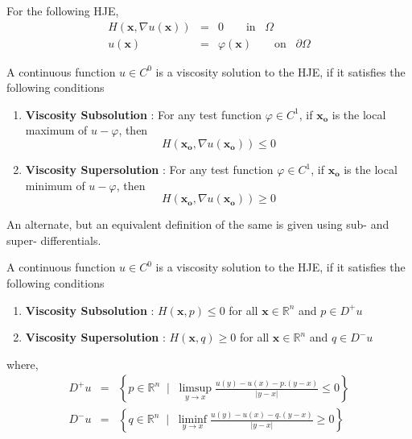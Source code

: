 \noindent
For the following HJE,
\begin{eqnarray}
  H(\mathbf{x},\nabla u(\mathbf{x})) &=& 0 \qquad \text{in} \;\;\; \Omega\\
  u(\mathbf{x}) &=& \varphi(\mathbf{x}) \qquad \text{on} \;\;\; \partial \Omega
\end{eqnarray}
\begin{definition}
  A continuous function $u\in C^0$ is a viscosity solution to the HJE,
  if it satisfies the following conditions
  \begin{enumerate}
  \item \textbf{Viscosity Subsolution} : For any test function
    $\varphi \in C^1$, if $\mathbf{x_o}$ is the local maximum of
    $u-\varphi$, then
    \begin{equation}\nonumber
      H(\mathbf{x_o}, \nabla u(\mathbf{x_o}) ) \le 0
    \end{equation}

  \item \textbf{Viscosity Supersolution} : For any test function
    $\varphi \in C^1$, if $\mathbf{x_o}$ is the local minimum of
    $u-\varphi$, then
    \begin{equation}\nonumber
      H(\mathbf{x_o}, \nabla u(\mathbf{x_o}) ) \ge 0
    \end{equation}
  \end{enumerate}
  \label{def:1}
\end{definition}
An alternate, but an equivalent definition of the same is given using
sub- and super- differentials.
\begin{definition}
  A continuous function $u\in C^0$ is a viscosity solution to the HJE,
  if it satisfies the following conditions
  \begin{enumerate}
  \item \textbf{Viscosity Subsolution} : $H(\mathbf{x},p) \le 0$ for
    all $\mathbf{x} \in \mathbb{R}^n$ and $p\in D^+u$

  \item \textbf{Viscosity Supersolution} : $H(\mathbf{x},q) \ge 0$ for
    all $\mathbf{x} \in \mathbb{R}^n$ and $q\in D^-u$
  \end{enumerate}
  \label{def:2}
  where,
  \begin{eqnarray}
    D^+u &=& \left\{p \in \mathbb{R}^n \;\; \Big |\;\; \limsup\limits_{y\to x} \frac{u(y)-u(x) - p.(y-x)}{\lvert y-x \rvert} \le 0\right\}\label{eq:7}\\
    D^-u &=& \left\{q \in \mathbb{R}^n \;\; \Big |\;\; \liminf\limits_{y\to x} \frac{u(y)-u(x) - q.(y-x)}{\lvert y-x \rvert} \ge 0\right\}\label{eq:8}
  \end{eqnarray}
\end{definition}

